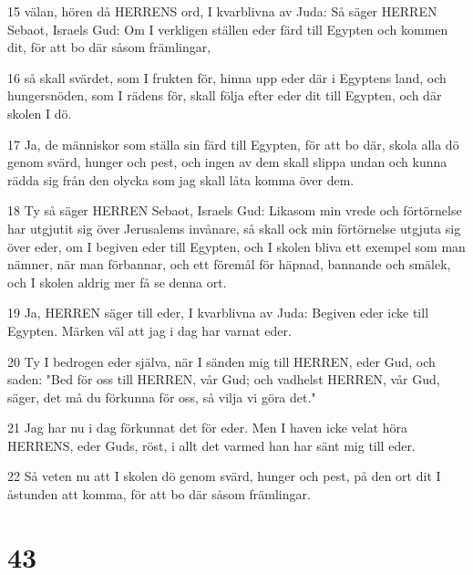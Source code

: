 \par 15 välan, hören då HERRENS ord, I kvarblivna av Juda: Så säger HERREN Sebaot, Israels Gud: Om I verkligen ställen eder färd till Egypten och kommen dit, för att bo där såsom främlingar,
\par 16 så skall svärdet, som I frukten för, hinna upp eder där i Egyptens land, och hungersnöden, som I rädens för, skall följa efter eder dit till Egypten, och där skolen I dö.
\par 17 Ja, de människor som ställa sin färd till Egypten, för att bo där, skola alla dö genom svärd, hunger och pest, och ingen av dem skall slippa undan och kunna rädda sig från den olycka som jag skall låta komma över dem.
\par 18 Ty så säger HERREN Sebaot, Israels Gud: Likasom min vrede och förtörnelse har utgjutit sig över Jerusalems invånare, så skall ock min förtörnelse utgjuta sig över eder, om I begiven eder till Egypten, och I skolen bliva ett exempel som man nämner, när man förbannar, och ett föremål för häpnad, bannande och smälek, och I skolen aldrig mer få se denna ort.
\par 19 Ja, HERREN säger till eder, I kvarblivna av Juda: Begiven eder icke till Egypten. Märken väl att jag i dag har varnat eder.
\par 20 Ty I bedrogen eder själva, när I sänden mig till HERREN, eder Gud, och saden: "Bed för oss till HERREN, vår Gud; och vadhelst HERREN, vår Gud, säger, det må du förkunna för oss, så vilja vi göra det."
\par 21 Jag har nu i dag förkunnat det för eder. Men I haven icke velat höra HERRENS, eder Guds, röst, i allt det varmed han har sänt mig till eder.
\par 22 Så veten nu att I skolen dö genom svärd, hunger och pest, på den ort dit I åstunden att komma, för att bo där såsom främlingar.

\chapter{43}

